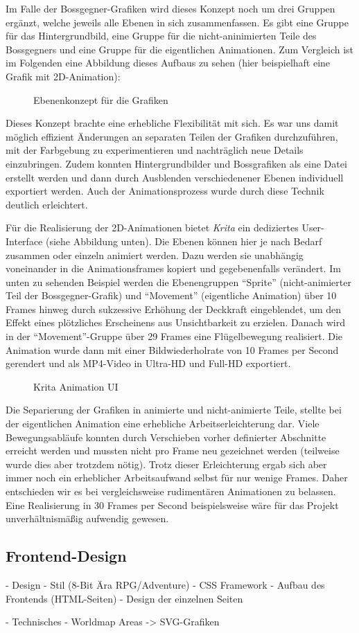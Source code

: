 Im Falle der Bossgegner-Grafiken wird dieses Konzept noch um drei Gruppen ergänzt, welche jeweils alle Ebenen in sich zusammenfassen. Es gibt eine Gruppe für das Hintergrundbild, eine Gruppe für die nicht-aninimierten Teile des Bossgegners und eine Gruppe für die eigentlichen Animationen.
Zum Vergleich ist im Folgenden eine Abbildung dieses Aufbaus zu sehen (hier beispielhaft eine Grafik mit 2D-Animation):

\begin{figure}[H]
    \centering
    \caption{Ebenenkonzept für die Grafiken}
    \label{fig:krita_layer_example}
\end{figure}

\pagebreak
Dieses Konzept brachte eine erhebliche Flexibilität mit sich. Es war uns damit möglich effizient Änderungen an separaten Teilen der Grafiken durchzuführen, mit der Farbgebung zu experimentieren und nachträglich neue Details einzubringen. Zudem konnten Hintergrundbilder und Bossgrafiken als eine Datei erstellt werden und dann durch Ausblenden verschiedenener Ebenen individuell exportiert werden. Auch der Animationsprozess wurde durch diese Technik deutlich erleichtert. 

Für die Realisierung der 2D-Animationen bietet \textit{Krita} ein dediziertes User-Interface (siehe Abbildung unten). Die Ebenen können hier je nach Bedarf zusammen oder einzeln animiert werden. Dazu werden sie unabhängig voneinander in die Animationsframes kopiert und gegebenenfalls verändert. Im unten zu sehenden Beispiel werden die Ebenengruppen \enquote{Sprite} (nicht-animierter Teil der Bossgegner-Grafik) und \enquote{Movement} (eigentliche Animation) über 10 Frames hinweg durch sukzessive Erhöhung der Deckkraft eingeblendet, um den Effekt eines plötzliches Erscheinens aus Unsichtbarkeit zu erzielen. Danach wird in der \enquote{Movement}-Gruppe über 29 Frames eine Flügelbewegung realisiert. Die Animation wurde dann mit einer Bildwiederholrate von 10 Frames per Second gerendert und als MP4-Video in Ultra-HD und Full-HD exportiert. 

\begin{figure}[H]
    \centering
    \caption{Krita Animation UI}
    \label{fig:krita_animation_example}
\end{figure}

Die Separierung der Grafiken in animierte und nicht-animierte Teile, stellte bei der eigentlichen Animation eine erhebliche Arbeitserleichterung dar. Viele Bewegungsabläufe konnten durch Verschieben vorher definierter Abschnitte erreicht werden und mussten nicht pro Frame neu gezeichnet werden (teilweise wurde dies aber trotzdem nötig). Trotz dieser Erleichterung ergab sich aber immer noch ein erheblicher Arbeitsaufwand selbst für nur wenige Frames. Daher entschieden wir es bei vergleichsweise rudimentären Animationen zu belassen. Eine Realisierung in 30 Frames per Second beispielsweise wäre für das Projekt unverhältnismäßig aufwendig gewesen.

\subsection{Frontend-Design}
    - Design
        - Stil (8-Bit Ära RPG/Adventure)
        - CSS Framework
        - Aufbau des Frontends (HTML-Seiten)
        - Design der einzelnen Seiten 

    - Technisches
        - Worldmap Areas -> SVG-Grafiken

    